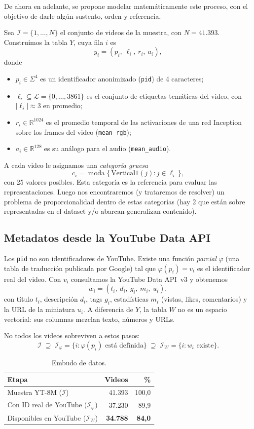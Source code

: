 \documentclass[11pt,a4paper]{article}
\newcommand{\R}{\mathbb{R}}
\newcommand{\Lab}{\mathcal{L}}
\DeclareMathOperator{\moda}{moda}
\begin{document}
De ahora en adelante, se propone modelar matemáticamente este proceso, con el objetivo de darle algún sustento, orden y referencia. 

Sea $\mathcal{I} = \{1, \dots, N\}$ el conjunto de videos de la muestra, con $N = 41.393$.
Construimos la tabla $Y$, cuya fila $i$ es
\[
  y_i = (p_i,\ \ell_i,\ r_i,\ a_i),
\]
donde
\begin{itemize}
  \item $p_i \in \Sigma^4$ es un identificador anonimizado (\texttt{pid}) de 4 caracteres;
  \item $\ell_i \subseteq \Lab = \{0, \dots, 3861\}$ es el conjunto de etiquetas temáticas del
        video, con $|\ell_i| \approx 3$ en promedio;
  \item $r_i \in \R^{1024}$ es el promedio temporal de las activaciones de una red Inception
        sobre los frames del video (\texttt{mean\_rgb});
  \item $a_i \in \R^{128}$ es su análogo para el audio (\texttt{mean\_audio}).
\end{itemize}
A cada video le asignamos una \emph{categoría gruesa}
\[
  c_i = \moda\{\, \mathrm{Vertical1}(j) : j \in \ell_i \,\},
\]
con 25 valores posibles. Esta categoría es la referencia para evaluar las representaciones.
Luego nos encontraremos (y trataremos de resolver) un problema de proporcionalidad dentro de estas categorías (hay 2 que están sobre representadas en el dataset y/o abarcan-generalizan contenido).

\subsection{Metadatos desde la YouTube Data API}
Los \texttt{pid} no son identificadores de YouTube. Existe una función \emph{parcial}
$\varphi$ (una tabla de traducción publicada por Google) tal que $\varphi(p_i) = v_i$ es el
identificador real del video. Con $v_i$ consultamos la YouTube Data API~v3 y obtenemos
\[
  w_i = (t_i,\ d_i,\ g_i,\ m_i,\ u_i),
\]
con título $t_i$, descripción $d_i$, tags $g_i$, estadísticas $m_i$ (vistas, likes,
comentarios) y la URL de la miniatura $u_i$. A diferencia de $Y$, la tabla $W$ no es un
espacio vectorial: sus columnas mezclan texto, números y URLs.

No todos los videos sobreviven a estos pasos:
\[
  \mathcal{I} \;\supseteq\; \mathcal{I}_\varphi = \{ i : \varphi(p_i) \text{ está definida} \}
  \;\supseteq\; \mathcal{I}_W = \{ i : w_i \text{ existe} \}.
\]

\begin{table}[H]
  \centering
  \caption{Embudo de datos.}
  \label{tab:embudo}
  \begin{tabular}{lrr}
    \toprule
    Etapa & Videos & \% \\
    \midrule
    Muestra YT-8M ($\mathcal{I}$)                  & 41.393 & 100,0 \\
    Con ID real de YouTube ($\mathcal{I}_\varphi$) & 37.230 &  89,9 \\
    Disponibles en YouTube ($\mathcal{I}_W$)       & \textbf{34.788} & \textbf{84,0} \\
    \bottomrule
  \end{tabular}
\end{table}
\end{document}

